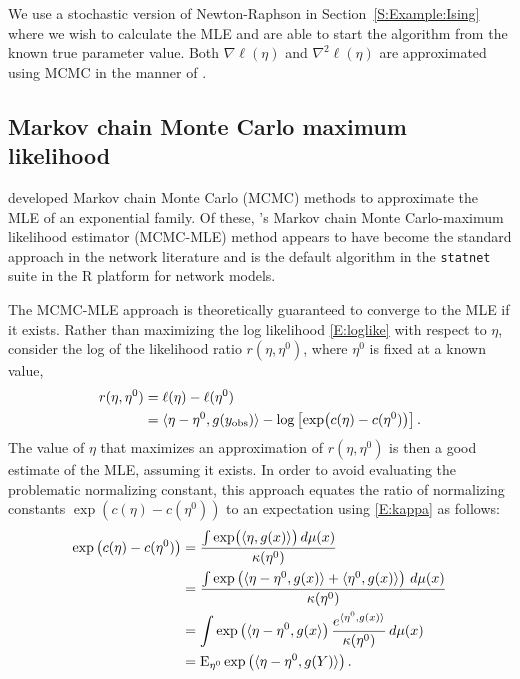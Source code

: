 We use a stochastic version of Newton-Raphson in Section~\ref{S:Example:Ising} where we wish
to calculate the MLE and are able to start the algorithm from the known true parameter value.
Both $\nabla \ell(\eta)$ and $\nabla^2 \ell(\eta)$ are approximated using MCMC 
in the manner of \citep{Penttinen:1984}.
\subsection{Markov chain Monte Carlo maximum likelihood} \label{S:MCMC-MLE}
\citet{Geyer:1992, Corander:1998, Snijders:2002} developed Markov chain Monte Carlo 
(MCMC) methods to approximate the MLE of an exponential family.  Of these, \citeauthor
{Geyer:1992}'s Markov chain Monte Carlo-maximum likelihood estimator (MCMC-MLE) method 
appears to have become the standard approach in the network literature 
\citep{Hunter:2006, Handcock:2006, GOF} and is the default algorithm in 
the \texttt{statnet} suite \citep{statnet:R} in the R platform for network models.  

The MCMC-MLE approach is theoretically guaranteed to converge to the MLE if it exists.  
Rather than maximizing the log likelihood \eqref{E:loglike}
with respect to $\eta$, \citeauthor{Geyer:1992} consider 
the log of the likelihood ratio $r( \eta, \eta^0 )$, where $\eta^0$ 
is fixed at a known value,
\begin{align}
 r( \eta, \eta^0 ) &= \ell( \eta ) - \ell( \eta^0 ) \notag \\ 
				  &= \langle  \eta - \eta^0, g(y_{\text{obs}}) \rangle - \log \left [ \exp \bigl( c(\eta) - c(\eta^0) \bigr) \right ].\label{E:r}
\end{align}
The value of $\eta$ that maximizes an
approximation of $r( \eta, \eta^0 )$ is then a good estimate of the MLE, 
assuming it exists.  In order to avoid evaluating the problematic normalizing constant,
this approach equates the ratio of normalizing constants 
$\exp \left (  c(\eta) - c(\eta^0) \right )$ to an expectation 
using \eqref{E:kappa} as follows:
\begin{align*}
	\exp \left (  c(\eta) - c(\eta^0) \right ) &= \frac{ \int \exp \bigl ( \langle  \eta, g(x)  \rangle\bigr ) \, d\mu(x) }{ \kappa(\eta^0)  } \\
	&= \frac{ \int \exp \left ( \langle  \eta - \eta^0, g(x) \rangle + \langle  \eta^0, g(x) \rangle \right ) \, d\mu(x)  }{ \kappa(\eta^0) } \\
	&= \int \exp \left( \langle \eta - \eta^0, g(x \rangle \right ) \frac{ e^ { \langle  \eta^0, g(x) \rangle } }{ \kappa(\eta^0) } \, d\mu(x)\\
	&= \operatorname{E}_{\eta^0} \exp \left( \langle  \eta - \eta^0, g(Y) \rangle  \right ) .
\end{align*}

